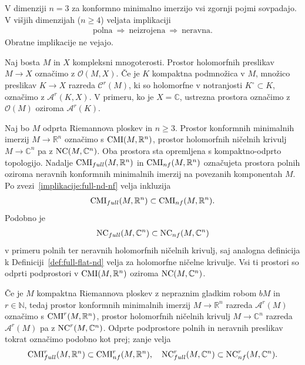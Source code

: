\documentclass[12pt,a4paper,twoside]{article}
\theoremstyle{definition} %
\theoremstyle{plain} %
\numberwithin{equation}{section}  %
\newcommand{\R}{\mathbb R}
\newcommand{\N}{\mathbb N}
\newcommand{\C}{\mathbb C}
\begin{document}
V dimenziji  $n=3$ za konformno minimalno imerzijo vsi zgornji pojmi sovpadajo. V višjih dimenzijah ($n \geq 4$) veljata implikaciji
\begin{gather} \label{implikacije:full-nd-nf}
\text{polna} \ \Rightarrow \ \text{neizrojena} \ \Rightarrow \ \text{neravna}.
\end{gather}
Obratne implikacije ne vejajo.

Naj bosta $M$ in $X$ kompleksni mnogoterosti. Prostor holomorfnih preslikav $M \to X$ označimo z $\mathcal{O}(M,X)$.
Če je $K$ kompaktna podmnožica v $M$, množico preslikav $K \to X$ razreda $\mathcal{C}^{r}(M)$, ki so holomorfne v notranjosti $K^\circ \subset K$, označimo z $\mathcal{A}^{r}(K,X)$.
V primeru, ko je $X = \C$, ustrezna prostora označimo z $\mathcal{O}(M)$ oziroma $\mathcal{A}^{r}(K)$.

Naj bo $M$ odprta Riemannova ploskev in $n \geq 3$. Prostor konformnih minimalnih imerzij $M \to \R^{n}$ označimo s $\textup{CMI}(M, \R^{n})$, prostor holomorfnih ničelnih krivulj $M \to \C^{n}$ pa z $\textup{NC}(M, \C^{n})$. Oba prostora sta opremljena s kompaktno-odprto topologijo.
Nadalje $\textup{CMI}_{full}(M, \R^{n})$ in $\textup{CMI}_{nf}(M, \R^{n})$ označujeta prostora polnih oziroma neravnih konformnih minimalnih imerzij na povezanih komponentah $M$. Po zvezi~\eqref{implikacije:full-nd-nf} velja inkluzija 
\begin{gather*}
\textup{CMI}_{full}(M, \R^{n}) \subset \textup{CMI}_{nf}(M, \R^{n}).
\end{gather*}
%
Podobno je 
\begin{gather*}
\textup{NC}_{full}(M, \C^{n}) \subset \textup{NC}_{nf}(M, \C^{n})
\end{gather*} 
v primeru polnih ter neravnih holomorfnih ničelnih krivulj, saj analogna definicija k Definiciji~\ref{def:full-flat-nd} velja za holomorfne ničelne krivulje. Vsi ti prostori so odprti podprostori v $\textup{CMI}(M, \R^{n})$ oziroma $\textup{NC}(M, \C^{n})$.

Če je $M$ kompaktna Riemannova ploskev z nepraznim gladkim robom $bM$ in $r \in \N$, tedaj prostor konformnih minimalnih imerzij $M \to \R^{n}$ razreda $\mathcal{A}^{r}(M)$ označimo s $\textup{CMI}^{r}(M, \R^{n})$, prostor holomorfnih ničelnih krivulj $M \to \C^{n}$ razreda $\mathcal{A}^{r}(M)$ pa z $\textup{NC}^{r}(M, \C^{n})$.
Odprte podprostore polnih in neravnih preslikav tokrat označimo podobno kot prej; zanje velja
\begin{gather*}
\textup{CMI}_{full}^{r}(M, \R^{n}) \subset \textup{CMI}_{nf}^{r}(M, \R^{n}), \quad \textup{NC}_{full}^{r}(M, \C^{n}) \subset \textup{NC}_{nf}^{r}(M, \C^{n}).
\end{gather*}
\end{document}

